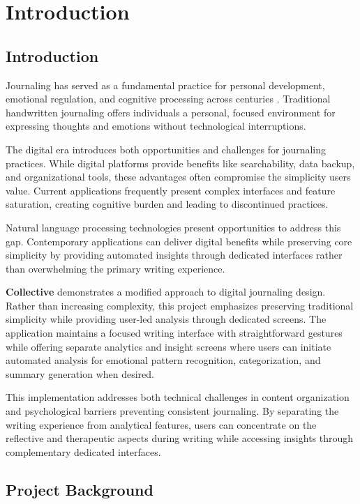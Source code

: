 \chapter{Introduction}\label{ch:intro}


\section{Introduction}\label{sec:introch1}

Journaling has served as a fundamental practice for personal development, emotional regulation, and cognitive processing across centuries \cite{pennebaker1999forming}. Traditional handwritten journaling offers individuals a personal, focused environment for expressing thoughts and emotions without technological interruptions.

The digital era introduces both opportunities and challenges for journaling practices. While digital platforms provide benefits like searchability, data backup, and organizational tools, these advantages often compromise the simplicity users value. Current applications frequently present complex interfaces and feature saturation, creating cognitive burden and leading to discontinued practices.

Natural language processing technologies present opportunities to address this gap. Contemporary applications can deliver digital benefits while preserving core simplicity by providing automated insights through dedicated interfaces rather than overwhelming the primary writing experience.

\textbf{Collective} demonstrates a modified approach to digital journaling design. Rather than increasing complexity, this project emphasizes preserving traditional simplicity while providing user-led analysis through dedicated screens. The application maintains a focused writing interface with straightforward gestures while offering separate analytics and insight screens where users can initiate automated analysis for emotional pattern recognition, categorization, and summary generation when desired.

This implementation addresses both technical challenges in content organization and psychological barriers preventing consistent journaling. By separating the writing experience from analytical features, users can concentrate on the reflective and therapeutic aspects during writing while accessing insights through complementary dedicated interfaces.

\section{Project Background}\label{sec:background}

